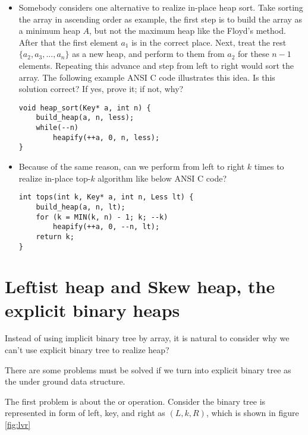 \documentclass{article}
\begin{document}
\begin{Exercise}
\begin{itemize}
\item Somebody considers one alternative to realize in-place heap sort. Take
sorting the array in ascending order as example, the first step is to build
the array as a minimum heap $A$, but not the maximum heap like the Floyd's method.
After that the first element $a_1$ is in the correct place. Next, treat
the rest $\{a_2, a_3, ..., a_n\}$ as a new heap, and perform
 to them from $a_2$ for these $n-1$ elements. Repeating this
advance and  step from left to right would sort the array.
The following example ANSI C code illustrates this idea.
Is this solution correct? If yes, prove it; if not, why?
\lstset{language=C}
\begin{lstlisting}
void heap_sort(Key* a, int n) {
    build_heap(a, n, less);
    while(--n)
        heapify(++a, 0, n, less);
}
\end{lstlisting}

\item Because of the same reason, can we perform  from
left to right $k$ times to realize in-place top-$k$ algorithm like below
ANSI C code?
\lstset{language=C}
\begin{lstlisting}
int tops(int k, Key* a, int n, Less lt) {
    build_heap(a, n, lt);
    for (k = MIN(k, n) - 1; k; --k)
        heapify(++a, 0, --n, lt);
    return k;
}
\end{lstlisting}
\end{itemize}
\end{Exercise}

\section{Leftist heap and Skew heap, the explicit binary heaps}
\label{ebheap}

Instead of using implicit binary tree by array, it is natural to
consider why we can't use explicit binary tree to realize heap?

There are some problems must be solved if we turn into explicit
binary tree as the under ground data structure.

The first problem is about the  or  operation.
Consider the binary tree is represented in form of left, key, and right as
$(L, k, R)$, which is shown in figure \ref{fig:lvr}
\end{document}
